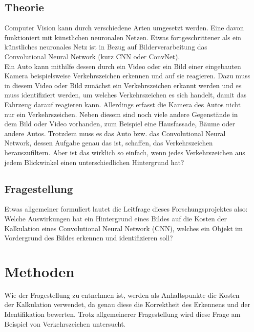 \documentclass[paper=A4,pagesize=auto,12pt,headinclude=true,footinclude=true,BCOR=0mm,DIV=calc]{scrartcl}
\newcommand{\sectionspace}{
	\vspace{0.5cm}
}
\begin{document}
\subsection{Theorie}\label{sec:Theorie} %
Computer Vision kann durch verschiedene Arten umgesetzt werden. Eine davon funktioniert mit künstlichen neuronalen Netzen. Etwas fortgeschrittener als ein künstliches neuronales Netz ist in Bezug auf Bilderverarbeitung das Convolutional Neural Network (kurz CNN oder ConvNet). \cite{script}\\
Ein Auto kann mithilfe dessen durch ein Video oder ein Bild einer eingebauten Kamera beispielsweise Verkehrszeichen erkennen und auf sie reagieren. Dazu muss in diesem Video oder Bild zunächst ein Verkehrszeichen erkannt werden und es muss identifiziert werden, um welches Verkehrszeichen es sich handelt, damit das Fahrzeug darauf reagieren kann. Allerdings erfasst die Kamera des Autos nicht nur ein Verkehrszeichen. Neben diesem sind noch viele andere Gegenstände in dem Bild oder Video vorhanden, zum Beispiel eine Hausfassade, Bäume oder andere Autos. Trotzdem muss es das Auto bzw. das Convolutional Neural Network, dessen Aufgabe genau das ist, schaffen, das Verkehrszeichen herauszufiltern. Aber ist das wirklich so einfach, wenn jedes Verkehrszeichen aus jedem Blickwinkel einen unterschiedlichen Hintergrund hat?

\subsection{Fragestellung}
Etwas allgemeiner formuliert lautet die Leitfrage dieses Forschungsprojektes also: Welche Auswirkungen hat ein Hintergrund eines Bildes auf die Kosten der Kalkulation eines Convolutional Neural Network (CNN), welches ein Objekt im Vordergrund des Bildes erkennen und identifizieren soll?

\sectionspace
\section{Methoden}\label{sec:Methoden}
Wie der Fragestellung zu entnehmen ist, werden als Anhaltspunkte die Kosten der Kalkulation verwendet, da genau diese die Korrektheit des Erkennens und der Identifikation bewerten. Trotz allgemeinerer Fragestellung wird diese Frage am Beispiel von Verkehrszeichen untersucht.
\end{document}
